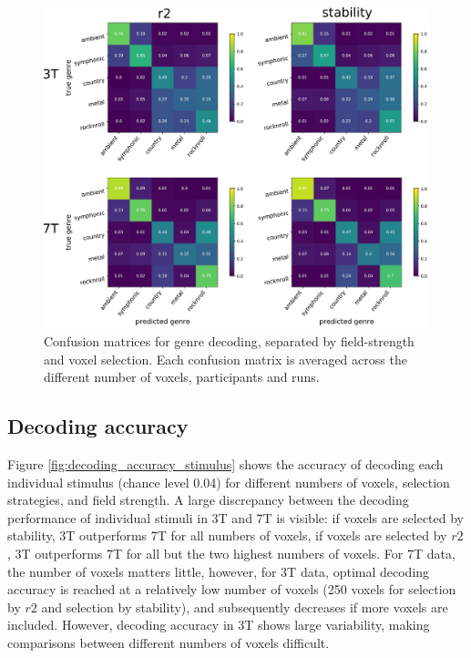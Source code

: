 \begin{figure}
  \centering
  \includegraphics[width=\linewidth]{pics/conf_mats.pdf}

  \caption{ Confusion matrices for genre decoding, separated by field-strength and voxel selection. Each confusion matrix is averaged across the different number of voxels, participants and runs.}

 \label{fig:confusion_matrices}
\end{figure}

\subsection*{Decoding accuracy}

Figure \ref{fig:decoding_accuracy_stimulus} shows the accuracy of decoding each
individual stimulus (chance level 0.04) for different numbers of voxels,
selection strategies, and field strength.
A large discrepancy between the decoding performance of individual stimuli in 3T
and 7T is visible: if voxels are selected by stability, 3T outperforms 7T for
all numbers of voxels, if voxels are selected by $r2$, 3T outperforms 7T for all
but the two highest numbers of voxels.
For 7T data, the number of voxels matters little, however, for 3T data, optimal
decoding accuracy is reached at a relatively low number of voxels (250 voxels
for selection by $r2$ and selection by stability), and subsequently decreases if
more voxels are included.
However, decoding accuracy in 3T shows large variability, making comparisons
between different numbers of voxels difficult.

